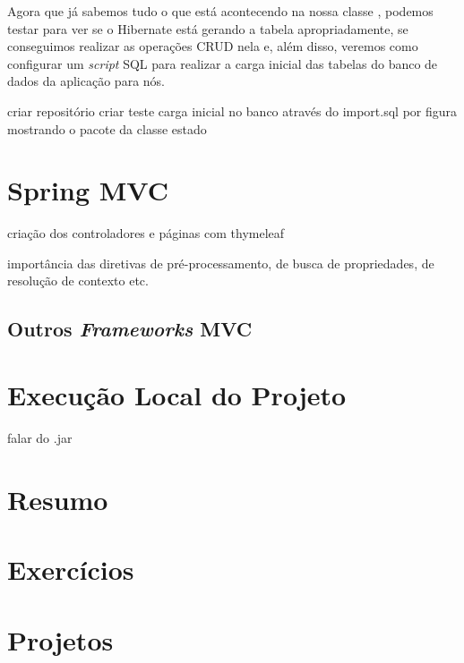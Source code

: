 Agora que já sabemos tudo o que está acontecendo na nossa classe , podemos testar para ver se o Hibernate está gerando a tabela apropriadamente, se conseguimos realizar as operações CRUD nela e, além disso, veremos como configurar um \textit{script} SQL para realizar a carga inicial das tabelas do banco de dados da aplicação para nós.

criar repositório
criar teste
carga inicial no banco através do import.sql
por figura mostrando o pacote da classe estado

\section{Spring MVC}

criação dos controladores e páginas com thymeleaf

importância das diretivas de pré-processamento, de busca de propriedades, de resolução de contexto etc.

\subsection{Outros \textit{Frameworks} MVC}


\section{Execução Local do Projeto}

falar do .jar


\section{Resumo}

\section{Exercícios}

\section{Projetos}
